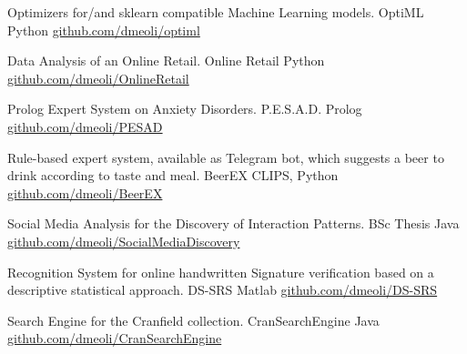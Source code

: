 

\begin{cventries}

  \cventry
    {Optimizers for/and sklearn compatible Machine Learning models.} %
    {OptiML} %
    {Python} %
    {\href{https://github.com/dmeoli/optiml}{github.com/dmeoli/optiml}} %
    {}
    
  \cventry
    {Data Analysis of an Online Retail.} %
    {Online Retail} %
    {Python} %
    {\href{https://github.com/dmeoli/OnlineRetail}{github.com/dmeoli/OnlineRetail}} %
    {}

  \cventry
    {Prolog Expert System on Anxiety Disorders.} %
    {P.E.S.A.D.} %
    {Prolog} %
    {\href{https://github.com/dmeoli/PESAD}{github.com/dmeoli/PESAD}} %
    {}

  \cventry
    {Rule-based expert system, available as Telegram bot, which suggests a beer to drink according to taste and meal.} %
    {BeerEX} %
    {CLIPS, Python} %
    {\href{https://github.com/dmeoli/BeerEX}{github.com/dmeoli/BeerEX}} %
    {}

  \cventry
    {Social Media Analysis for the Discovery of Interaction Patterns.} %
    {BSc Thesis} %
    {Java} %
    {\href{https://github.com/dmeoli/SocialMediaDiscovery}{github.com/dmeoli/SocialMediaDiscovery}} %
    {}

  \cventry
    {Recognition System for online handwritten Signature verification based on a descriptive statistical approach.} %
    {DS-SRS} %
    {Matlab} %
    {\href{https://github.com/dmeoli/DS-SRS}{github.com/dmeoli/DS-SRS}} %
    {}

  \cventry
    {Search Engine for the Cranfield collection.} %
    {CranSearchEngine} %
    {Java} %
    {\href{https://github.com/dmeoli/CranSearchEngine}{github.com/dmeoli/CranSearchEngine}} %
    {}


\end{cventries}
